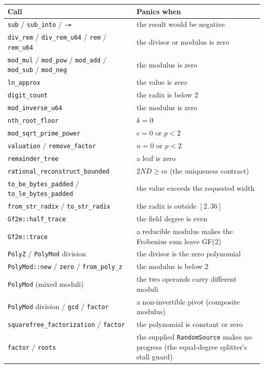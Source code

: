 \documentclass[11pt]{article}
\newcommand{\code}[1]{\texttt{#1}}
\begin{document}
\begin{center}
\begin{tabular}{@{}>{\raggedright\arraybackslash}p{}>{\raggedright\arraybackslash}p{}@{}}
\toprule
\textbf{Call} & \textbf{Panics when} \\
\midrule
\code{sub} / \code{sub\_into} / \code{-=} & the result would be negative \\
\code{div\_rem} / \code{div\_rem\_u64} / \code{rem} / \code{rem\_u64} & the divisor or modulus is zero \\
\code{mod\_mul} / \code{mod\_pow} / \code{mod\_add} / \code{mod\_sub} / \code{mod\_neg} & the modulus is zero \\
\code{ln\_approx} & the value is zero \\
\code{digit\_count} & the radix is below 2 \\
\code{mod\_inverse\_u64} & the modulus is zero \\
\code{nth\_root\_floor} & $k = 0$ \\
\code{mod\_sqrt\_prime\_power} & $e = 0$ or $p < 2$ \\
\code{valuation} / \code{remove\_factor} & $n = 0$ or $p < 2$ \\
\code{remainder\_tree} & a leaf is zero \\
\code{rational\_reconstruct\_bounded} & $2ND \ge m$ (the uniqueness contract) \\
\code{to\_be\_bytes\_padded} / \code{to\_le\_bytes\_padded} & the value exceeds the requested width \\
\code{from\_str\_radix} / \code{to\_str\_radix} & the radix is outside $[2, 36]$ \\
\code{Gf2m::half\_trace} & the field degree is even \\
\code{Gf2m::trace} & a reducible modulus makes the Frobenius sum leave GF(2) \\
\code{PolyZ} / \code{PolyMod} division & the divisor is the zero polynomial \\
\code{PolyMod::new} / \code{zero} / \code{from\_poly\_z} & the modulus is below 2 \\
\code{PolyMod} (mixed moduli) & the two operands carry different moduli \\
\code{PolyMod} division / \code{gcd} / \code{factor} & a non-invertible pivot (composite modulus) \\
\code{squarefree\_factorization} / \code{factor} & the polynomial is constant or zero \\
\code{factor} / \code{roots} & the supplied \code{RandomSource} makes no progress (the equal-degree splitter's stall guard) \\

\end{tabular}
\end{center}
\end{document}
